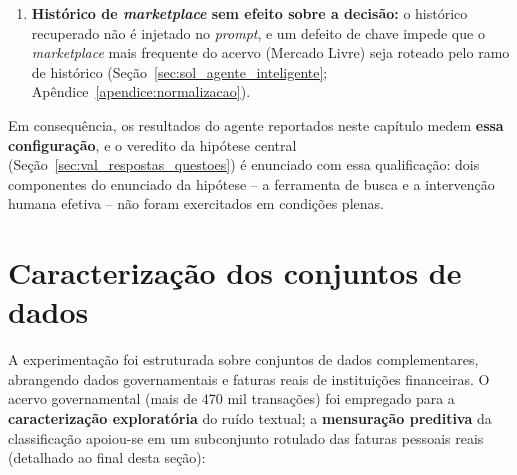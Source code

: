 \begin{enumerate}
	\item \textbf{Histórico de \textit{marketplace} sem efeito sobre a decisão:} o histórico recuperado não é injetado no \textit{prompt}, e um defeito de chave impede que o \textit{marketplace} mais frequente do acervo (Mercado Livre) seja roteado pelo ramo de histórico (Seção~\ref{sec:sol_agente_inteligente}; Apêndice~\ref{apendice:normalizacao}).
\end{enumerate}
Em consequência, os resultados do agente reportados neste capítulo medem \textbf{essa configuração}, e o veredito da hipótese central (Seção~\ref{sec:val_respostas_questoes}) é enunciado com essa qualificação: dois componentes do enunciado da hipótese -- a ferramenta de busca e a intervenção humana efetiva -- não foram exercitados em condições plenas.

\section{Caracterização dos conjuntos de dados}
\label{sec:val_datasets}

A experimentação foi estruturada sobre conjuntos de dados complementares, abrangendo dados governamentais e faturas reais de instituições financeiras. O acervo governamental (mais de 470 mil transações) foi empregado para a \textbf{caracterização exploratória} do ruído textual; a \textbf{mensuração preditiva} da classificação apoiou-se em um subconjunto rotulado das faturas pessoais reais (detalhado ao final desta seção):

